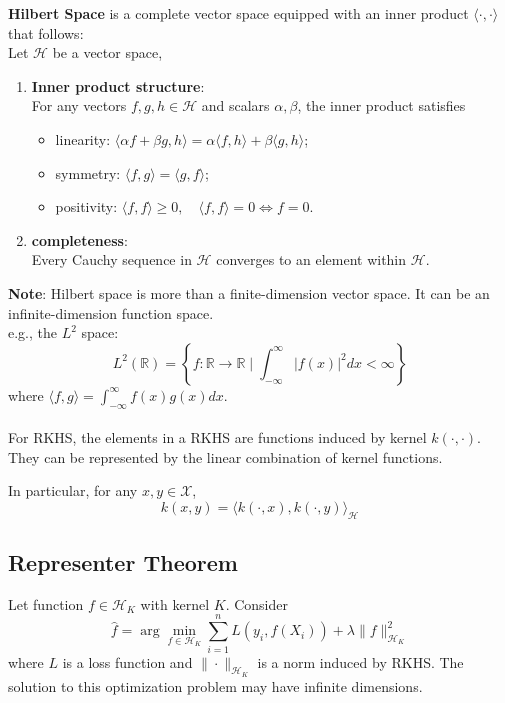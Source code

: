 \documentclass[12pt]{book}
\theoremstyle{definition}
\theoremstyle{remark}
\begin{document}
\begin{notionbox}
\textbf{Hilbert Space} is a complete vector space equipped with an inner product $\langle \cdot, \cdot \rangle$ that follows: \\
Let $\mathcal{H}$ be a vector space, 
\begin{enumerate}
    \item \textbf{Inner product structure}: \\
    For any vectors $f,g,h \in \mathcal{H}$ and scalars $\alpha, \beta$, the inner product satisfies 
    \begin{itemize}
        \item linearity: $
\langle \alpha f + \beta g, h \rangle = \alpha \langle f, h \rangle + \beta \langle g, h \rangle$;
        \item symmetry: $
\langle f, g \rangle = \langle g, f \rangle$;
        \item positivity: $
\langle f, f \rangle \geq 0, \quad \langle f, f \rangle = 0 \iff f = 0$.
    \end{itemize}
    \item \textbf{completeness}: \\
    Every Cauchy sequence in $\mathcal{H}$ converges to an element within $\mathcal{H}$.\\
\end{enumerate}

\textbf{Note}: Hilbert space is more than a finite-dimension vector space. It can be an infinite-dimension function space. \\e.g., the $L^2$ space: \[
L^2(\mathbb{R}) = \left\{ f: \mathbb{R} \to \mathbb{R} \mid \int_{-\infty}^{\infty} |f(x)|^2 dx < \infty \right\}
\] where $
\langle f, g \rangle = \int_{-\infty}^{\infty} f(x) g(x) dx$.\\
\\
For RKHS, the elements in a RKHS are functions induced by kernel $k(\cdot, \cdot)$. They can be represented by the linear combination of kernel functions.

\end{notionbox}

In particular, for any $x,y \in \mathcal{X}$, 
\[k(x,y) = \langle k(\cdot, x),k(\cdot,y)\rangle_\mathcal{H}\]


\subsection{Representer Theorem}
Let function $f\in \mathcal{H}_K$ with kernel $K$. Consider
\[\hat{f} = \arg\underset{f\in\mathcal{H}_K}{\min}\sum_{i=1}^nL(y_i,  f(X_i))+\lambda\|f\|_{\mathcal{H}_K}^2\]
where $L$ is a loss function and $\|\cdot\|_{\mathcal{H}_K}$ is a norm induced by RKHS. The solution to this optimization problem may have infinite dimensions.\\
\end{document}
